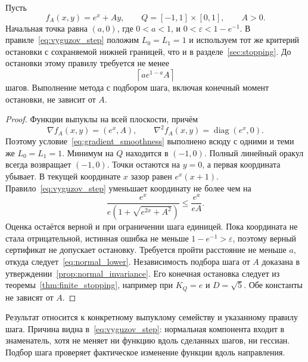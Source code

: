 \begin{theorem}
\label{thm:normal_separation}
Пусть
\[
 f_A(x,y)=e^x+Ay,\qquad Q=[-1,1]\times[0,1],\qquad A>0.
\]
Начальная точка равна $(a,0)$, где $0<a<1$, и
$0<\varepsilon<1-e^{-1}$. В правиле~\eqref{eq:vyguzov_step} положим
$L_0=L_1=1$ и используем тот же критерий остановки с сохраняемой
нижней границей, что и в разделе~\ref{sec:stopping}. До остановки
этому правилу требуется не менее
\begin{equation}\label{eq:normal_lower}
 \left\lceil a e^{1-a}A\right\rceil
\end{equation}
шагов. Выполнение метода с подбором шага, включая конечный момент
остановки, не зависит от $A$.
\end{theorem}
\begin{proof}
Функции выпуклы на всей плоскости, причём
\[
 \nabla f_A(x,y)=(e^x,A),\qquad
 \nabla^2f_A(x,y)=\operatorname{diag}(e^x,0).
\]
Поэтому условие~\eqref{eq:gradient_smoothness} выполнено всюду с
одними и теми же $L_0=L_1=1$. Минимум на $Q$ находится в $(-1,0)$.
Полный линейный оракул всегда возвращает $(-1,0)$. Точки остаются
на $y=0$, а первая координата убывает. В текущей координате $x$
зазор равен $e^x(x+1)$. Правило~\eqref{eq:vyguzov_step} уменьшает
координату не более чем на
\[
 \frac{e^x}{e(1+\sqrt{e^{2x}+A^2})}
 \le\frac{e^a}{eA}.
\]
Оценка остаётся верной и при ограничении шага единицей. Пока
координата не стала отрицательной, истинная ошибка не меньше
$1-e^{-1}>\varepsilon$, поэтому верный сертификат не допускает
остановку. Требуется пройти расстояние не меньше $a$, откуда
следует~\eqref{eq:normal_lower}.
Независимость подбора шага от $A$ доказана в
утверждении~\ref{prop:normal_invariance}. Его конечная остановка
следует из теоремы~\ref{thm:finite_stopping}, например при $K_Q=e$
и $D=\sqrt5$. Обе константы не зависят от $A$.
\end{proof}

Результат относится к конкретному выпуклому семейству и указанному
правилу шага. Причина видна в~\eqref{eq:vyguzov_step}: нормальная
компонента входит в знаменатель, хотя не меняет ни функцию вдоль
сделанных шагов, ни гессиан. Подбор шага проверяет фактическое
изменение функции вдоль направления.
